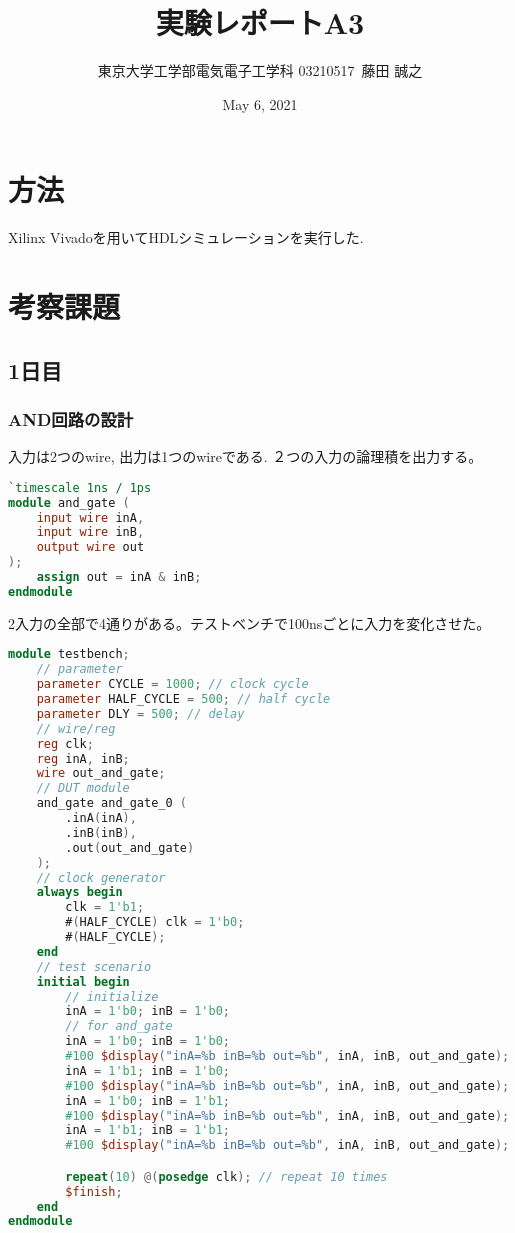 \documentclass{ltjsarticle}
\title{実験レポートA3}
\author{東京大学工学部電気電子工学科 03210517\ 藤田 誠之 }
\date{May 6, 2021}
\begin{document}
\maketitle

\section{方法}
Xilinx Vivadoを用いてHDLシミュレーションを実行した.
\section{考察課題}
\subsection{1日目}
\subsubsection{AND回路の設計}

入力は2つのwire, 出力は1つのwireである. ２つの入力の論理積を出力する。
\begin{lstlisting}[caption=AND回路デザイン,language=verilog]
`timescale 1ns / 1ps
module and_gate (
    input wire inA,
    input wire inB,
    output wire out
);
    assign out = inA & inB;
endmodule
\end{lstlisting}
2入力の全部で4通りがある。テストベンチで100nsごとに入力を変化させた。
\begin{lstlisting}[caption=AND回路テストベンチ,language=verilog]
    module testbench;
    // parameter
    parameter CYCLE = 1000; // clock cycle
    parameter HALF_CYCLE = 500; // half cycle
    parameter DLY = 500; // delay
    // wire/reg
    reg clk;
    reg inA, inB;
    wire out_and_gate;
    // DUT module
    and_gate and_gate_0 (
        .inA(inA),
        .inB(inB),
        .out(out_and_gate)
    );
    // clock generator
    always begin
        clk = 1'b1;
        #(HALF_CYCLE) clk = 1'b0;
        #(HALF_CYCLE);
    end
    // test scenario
    initial begin
        // initialize
        inA = 1'b0; inB = 1'b0; 
        // for and_gate
        inA = 1'b0; inB = 1'b0;
        #100 $display("inA=%b inB=%b out=%b", inA, inB, out_and_gate);
        inA = 1'b1; inB = 1'b0;
        #100 $display("inA=%b inB=%b out=%b", inA, inB, out_and_gate);  
        inA = 1'b0; inB = 1'b1;
        #100 $display("inA=%b inB=%b out=%b", inA, inB, out_and_gate);  
        inA = 1'b1; inB = 1'b1;
        #100 $display("inA=%b inB=%b out=%b", inA, inB, out_and_gate);

        repeat(10) @(posedge clk); // repeat 10 times
        $finish;
    end
endmodule
\end{lstlisting}
\end{document}
